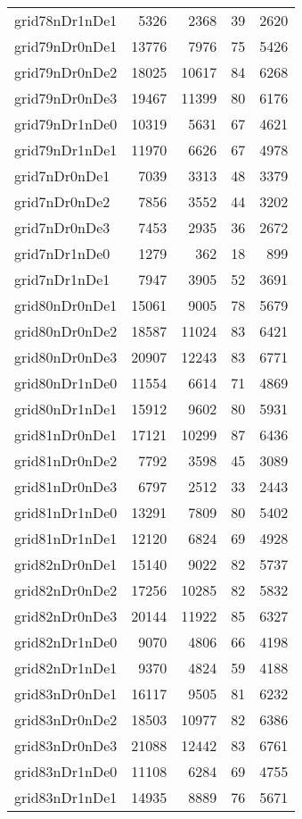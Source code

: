 \begin{longtable}{lrrrr}
grid78nDr1nDe1 & 5326 & 2368 & 39 & 2620 \\
grid79nDr0nDe1 & 13776 & 7976 & 75 & 5426 \\
grid79nDr0nDe2 & 18025 & 10617 & 84 & 6268 \\
grid79nDr0nDe3 & 19467 & 11399 & 80 & 6176 \\
grid79nDr1nDe0 & 10319 & 5631 & 67 & 4621 \\
grid79nDr1nDe1 & 11970 & 6626 & 67 & 4978 \\
grid7nDr0nDe1 & 7039 & 3313 & 48 & 3379 \\
grid7nDr0nDe2 & 7856 & 3552 & 44 & 3202 \\
grid7nDr0nDe3 & 7453 & 2935 & 36 & 2672 \\
grid7nDr1nDe0 & 1279 & 362 & 18 & 899 \\
grid7nDr1nDe1 & 7947 & 3905 & 52 & 3691 \\
grid80nDr0nDe1 & 15061 & 9005 & 78 & 5679 \\
grid80nDr0nDe2 & 18587 & 11024 & 83 & 6421 \\
grid80nDr0nDe3 & 20907 & 12243 & 83 & 6771 \\
grid80nDr1nDe0 & 11554 & 6614 & 71 & 4869 \\
grid80nDr1nDe1 & 15912 & 9602 & 80 & 5931 \\
grid81nDr0nDe1 & 17121 & 10299 & 87 & 6436 \\
grid81nDr0nDe2 & 7792 & 3598 & 45 & 3089 \\
grid81nDr0nDe3 & 6797 & 2512 & 33 & 2443 \\
grid81nDr1nDe0 & 13291 & 7809 & 80 & 5402 \\
grid81nDr1nDe1 & 12120 & 6824 & 69 & 4928 \\
grid82nDr0nDe1 & 15140 & 9022 & 82 & 5737 \\
grid82nDr0nDe2 & 17256 & 10285 & 82 & 5832 \\
grid82nDr0nDe3 & 20144 & 11922 & 85 & 6327 \\
grid82nDr1nDe0 & 9070 & 4806 & 66 & 4198 \\
grid82nDr1nDe1 & 9370 & 4824 & 59 & 4188 \\
grid83nDr0nDe1 & 16117 & 9505 & 81 & 6232 \\
grid83nDr0nDe2 & 18503 & 10977 & 82 & 6386 \\
grid83nDr0nDe3 & 21088 & 12442 & 83 & 6761 \\
grid83nDr1nDe0 & 11108 & 6284 & 69 & 4755 \\
grid83nDr1nDe1 & 14935 & 8889 & 76 & 5671 \\

\end{longtable}
